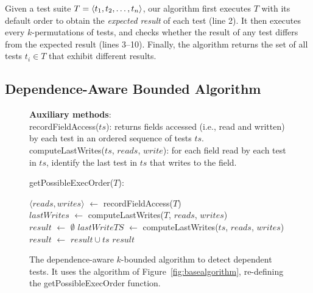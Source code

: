 Given a test suite $T =  \langle t_1, t_2, \ldots, t_n \rangle $, our algorithm
first executes $T$ with its default order
to obtain the \emph{expected result} of each test (line 2). 
It then executes every $k$-permutations of tests,
and checks whether the result of any test differs
from the expected result (lines 3--10). Finally, the algorithm returns the set
of all tests $t_i \in T$
that exhibit different results.





\subsection{Dependence-Aware Bounded Algorithm}
\label{sec:advalgorithm}

\begin{figure}[t]
\textbf{Auxiliary methods}:\\
recordFieldAccess($ts$): returns fields accessed (i.e., read and written) by each test in an ordered sequence of tests $ts$. \\
computeLastWrites($ts$, $reads$, $write$): for each field read by each test in $ts$, identify the last test in $ts$ that writes to the field.\\

\vspace{-2mm}

getPossibleExecOrder($T$):\\
\vspace{-5mm}
\begin{algorithmic}[1]
\STATE $\langle reads, writes\rangle$ $\leftarrow$ recordFieldAccess($T$)\\
\STATE $\mathit{lastWrites}$ $\leftarrow$ computeLastWrites($T$, $\mathit{reads}$, $\mathit{writes}$)
\\
\STATE $\mathit{result}$ $\leftarrow$ $\emptyset$
\STATE $\mathit{lastWriteTS}$ $\leftarrow$ computeLastWrites($ts$, $\mathit{reads}$, $\mathit{writes}$)
\vspace{-3mm}
\STATE $\mathit{result}$ $\leftarrow$ $\mathit{result} \cup \mathit{ts}$
\ENDIF
\ENDFOR
\RETURN $\mathit{result}$
\end{algorithmic}

\vspace{-3mm}
\caption {The dependence-aware $k$-bounded algorithm to detect dependent tests.
It uses the algorithm of Figure~\ref{fig:basealgorithm}, re-defining the
getPossibleExecOrder function.
} 
\label{fig:impralg}
\end{figure}

